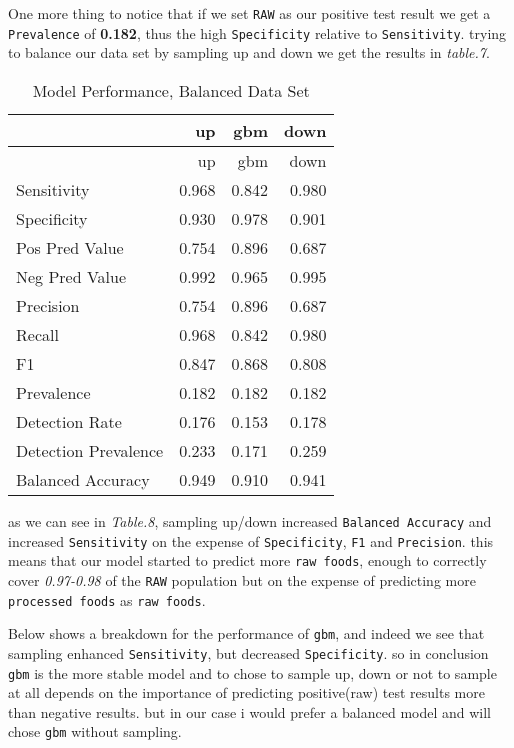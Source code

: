 \documentclass[]{article}
\begin{document}
One more thing to notice that if we set \texttt{RAW} as our positive
test result we get a \texttt{Prevalence} of \textbf{0.182}, thus the
high \texttt{Specificity} relative to \texttt{Sensitivity}. trying to
balance our data set by sampling up and down we get the results in
\emph{table.7}.

\begin{longtable}[]{@{}lrrr@{}}
\caption{Model Performance, Balanced Data Set}\tabularnewline
\toprule
& up & gbm & down\tabularnewline
\midrule
\endfirsthead
\toprule
& up & gbm & down\tabularnewline
\midrule
\endhead
Sensitivity & 0.968 & 0.842 & 0.980\tabularnewline
Specificity & 0.930 & 0.978 & 0.901\tabularnewline
Pos Pred Value & 0.754 & 0.896 & 0.687\tabularnewline
Neg Pred Value & 0.992 & 0.965 & 0.995\tabularnewline
Precision & 0.754 & 0.896 & 0.687\tabularnewline
Recall & 0.968 & 0.842 & 0.980\tabularnewline
F1 & 0.847 & 0.868 & 0.808\tabularnewline
Prevalence & 0.182 & 0.182 & 0.182\tabularnewline
Detection Rate & 0.176 & 0.153 & 0.178\tabularnewline
Detection Prevalence & 0.233 & 0.171 & 0.259\tabularnewline
Balanced Accuracy & 0.949 & 0.910 & 0.941\tabularnewline
\bottomrule
\end{longtable}

as we can see in \emph{Table.8}, sampling up/down increased
\texttt{Balanced\ Accuracy} and increased \texttt{Sensitivity} on the
expense of \texttt{Specificity}, \texttt{F1} and \texttt{Precision}.
this means that our model started to predict more \texttt{raw\ foods},
enough to correctly cover \emph{0.97-0.98} of the \texttt{RAW}
population but on the expense of predicting more
\texttt{processed\ foods} as \texttt{raw\ foods}.

Below shows a breakdown for the performance of \texttt{gbm}, and indeed
we see that sampling enhanced \texttt{Sensitivity}, but decreased
\texttt{Specificity}. so in conclusion \texttt{gbm} is the more stable
model and to chose to sample up, down or not to sample at all depends on
the importance of predicting positive(raw) test results more than
negative results. but in our case i would prefer a balanced model and
will chose \texttt{gbm} without sampling.

\newpage
\end{document}
